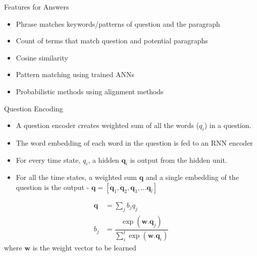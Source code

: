 \begin{frame}{Features for Answers }
\begin{itemize}
	\item Phrase matches keywords/patterns of question and the paragraph
	\item Count of terms that match question and potential paragraphs
	\item Cosine similarity
	\item Pattern matching using trained ANNs
	\item Probabilistic methods using alignment methods
\end{itemize}
\end{frame}

\begin{frame}{Question Encoding}
\begin{itemize}
	\item A question encoder creates weighted sum of all the words ($q_i$) in a question.
	\item 	The word embedding of each word in the question is fed to an RNN encoder
	\item For every time state, $q_i$, a hidden $\mathbf{q}_i$ is output from the hidden unit.
	\item For all the time states, a weighted sum $\mathbf{q}$ and a single embedding of the question is the output - $\mathbf{q} = \left[\mathbf{q}_1,\mathbf{q}_2,\mathbf{q}_3,\ldots\mathbf{q}_l\right]$

\end{itemize}
\begin{align}
\mathbf{q} &= \sum_j b_jq_j \\
b_j &= \dfrac{\exp({\textbf{w}}.\textbf{q}_j)}{\sum_{i}^{t}\exp(\textbf{w}.\textbf{q}_i)}
\end{align}
where $\textbf{w}$ is the weight vector to be learned
\end{frame}


